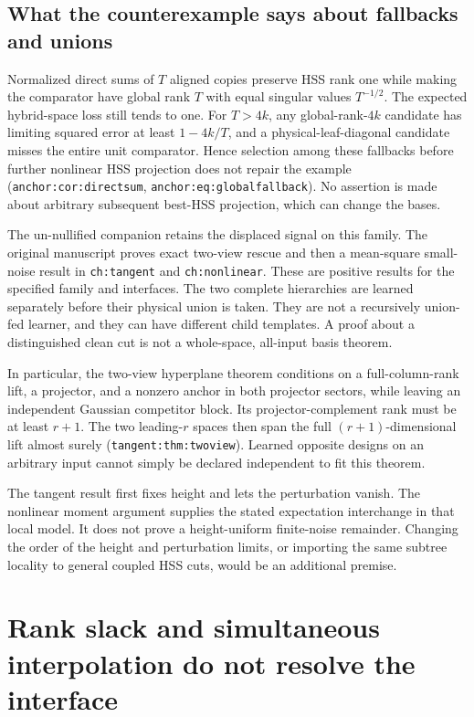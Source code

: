 \documentclass[11pt,oneside,openany,a4paper]{report}
\numberwithin{equation}{chapter}
\theoremstyle{definition}
\theoremstyle{remark}
\begin{document}
\subsection{What the counterexample says about fallbacks and unions}

Normalized direct sums of $T$ aligned copies preserve HSS rank one
while making the comparator have global rank $T$ with equal
singular values $T^{-1/2}$.  The expected hybrid-space loss still
tends to one.  For $T>4k$, any global-rank-$4k$ candidate has limiting
squared error at least $1-4k/T$, and a physical-leaf-diagonal
candidate misses the entire unit comparator.  Hence selection among
these fallbacks before further nonlinear HSS projection does not
repair the example
(\texttt{anchor:cor:directsum}, \texttt{anchor:eq:globalfallback}).
No assertion is made about arbitrary subsequent best-HSS
projection, which can change the bases.

The un-nullified companion retains the displaced signal on this
family.  The original manuscript proves exact two-view rescue and
then a mean-square small-noise result in
\texttt{ch:tangent} and \texttt{ch:nonlinear}.  These are positive
results for the specified family and interfaces.  The two complete
hierarchies are learned separately before their physical union is
taken.  They are not a recursively union-fed learner, and they can
have different child templates.  A proof about a distinguished
clean cut is not a whole-space, all-input basis theorem.

In particular, the two-view hyperplane theorem conditions on a
full-column-rank lift, a projector, and a nonzero anchor in both
projector sectors, while leaving an independent Gaussian
competitor block.  Its projector-complement rank must be at
least $r+1$.  The two leading-$r$ spaces then span the full
$(r+1)$-dimensional lift almost surely
(\texttt{tangent:thm:twoview}).  Learned opposite designs on an
arbitrary input cannot simply be declared independent to fit
this theorem.

The tangent result first fixes height and lets the perturbation
vanish.  The nonlinear moment argument supplies the stated
expectation interchange in that local model.  It does not prove a
height-uniform finite-noise remainder.  Changing the order of the
height and perturbation limits, or importing the same subtree
locality to general coupled HSS cuts, would be an additional premise.

\section{Rank slack and simultaneous interpolation do not resolve the interface}
\label{origobs:rank-slack}
\end{document}
